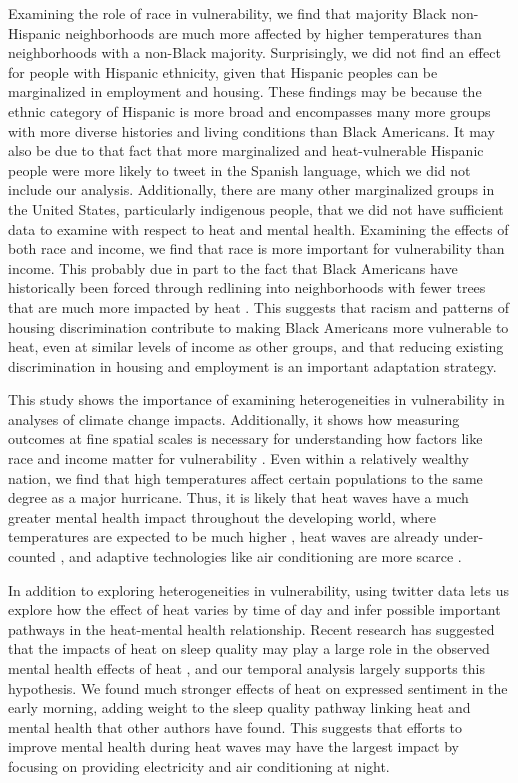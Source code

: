 \documentclass[9pt,twocolumn,twoside,lineno]{pnas-new}
\begin{document}
Examining the role of race in vulnerability, we find that majority Black non-Hispanic neighborhoods are much more affected by higher temperatures than neighborhoods with a non-Black majority. Surprisingly, we did not find an effect for people with Hispanic ethnicity, given that Hispanic peoples can be marginalized in employment and housing. These findings may be because the ethnic category of Hispanic is more broad and encompasses many more groups with more diverse histories and living conditions than Black Americans. It may also be due to that fact that more marginalized and heat-vulnerable Hispanic people were more likely to tweet in the Spanish language, which we did not include our analysis. Additionally, there are many other marginalized groups in the United States, particularly indigenous people, that we did not have sufficient data to examine with respect to heat and mental health. Examining the effects of both race and income, we find that race is more important for vulnerability than income. This probably due in part to the fact that Black Americans have historically been forced through redlining into neighborhoods with fewer trees that are much more impacted by heat \cite{Hoffman2020, Locke2021}.  This suggests that racism and patterns of housing discrimination contribute to making Black Americans more vulnerable to heat, even at similar levels of income as other groups, and that reducing existing discrimination in housing and employment is an important adaptation strategy.

This study shows the importance of examining heterogeneities in vulnerability in analyses of climate change impacts.  Additionally, it shows how measuring outcomes at fine spatial scales is necessary for understanding how factors like race and income matter for vulnerability \cite{Tong2021}. Even within a relatively wealthy nation, we find that high temperatures affect certain populations to the same degree as a major hurricane. Thus, it is likely that heat waves have a much greater mental health impact throughout the developing world, where temperatures are expected to be much higher \cite{Raymond2020May}, heat waves are already under-counted \cite{Harrington2020Sep}, and adaptive technologies like air conditioning are more scarce \cite{Biardeau2020Jan}.

In addition to exploring heterogeneities in vulnerability, using twitter data lets us explore how the effect of heat varies by time of day and infer possible important pathways in the heat-mental health relationship. Recent research has suggested that the impacts of heat on sleep quality may play a large role in the observed mental health effects of heat \cite{Obradovich2017May, Mullins2019Dec}, and our temporal analysis largely supports this hypothesis.  We found much stronger effects of heat on expressed sentiment in the early morning, adding weight to the sleep quality pathway linking heat and mental health that other authors have found.  This suggests that efforts to improve mental health during heat waves may have the largest impact by focusing on providing electricity and air conditioning at night.
\end{document}
